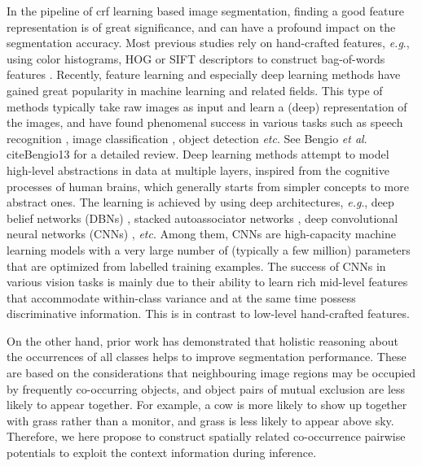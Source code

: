 \documentclass[10pt,3p]{elsarticle}
\def\onedot{.\xspace}
\def\eg{\emph{e.g}\onedot}
\def\etc{\emph{etc}\onedot}
\def\etal{\emph{et al}\onedot}
\newcommand{\crf}{{\sc crf}\xspace}
\begin{document}
In the pipeline of \crf learning based image segmentation, finding a good feature representation is of great significance, and can have a profound impact on the segmentation accuracy. Most previous studies rely on hand-crafted features, \eg, using color histograms, HOG or SIFT descriptors to construct bag-of-words features \cite{Fulkerson08,Fulkerson09,Lucchi12,Yao12,Lucchi13}.
Recently, feature learning and especially deep learning methods have gained great popularity
in machine learning and related fields.
This type of methods typically take raw images as input and learn a (deep) representation
of the images, and have found phenomenal success in various tasks such as speech recognition \cite{Hinton06}, image classification
\cite{deepCNN12,decaf13}, object detection \cite{Ross14} \etc See Bengio \etal \\cite{Bengio13} for a detailed
review.
Deep learning methods attempt to model high-level abstractions in data at multiple layers,
inspired from the cognitive processes of human brains, which generally starts from simpler
concepts to more abstract ones.
The learning is achieved by using deep architectures, \eg, deep belief networks (DBNs) \cite{Hinton06}, stacked autoassociator networks \cite{Bengio07},
deep convolutional
neural networks (CNNs)
\cite{Lecun98,deepCNN12,CVPR15b}, \etc
%
%
%
%
Among them, CNNs are high-capacity machine learning models with a very large number of (typically a
few million)
parameters that are optimized from labelled training examples.
The success of CNNs in various vision tasks \cite{Lecun98,deepCNN12} is mainly
due to their ability to learn rich mid-level features that accommodate within-class
variance and at the same time possess discriminative information.
This is in  contrast to low-level hand-crafted features.


On the other hand, prior work \cite{Rabinovich07,Ladicky13,Roy14} has demonstrated that holistic reasoning about the occurrences of all classes helps to improve segmentation performance.
These are based on the considerations that neighbouring image regions may be occupied by frequently co-occurring objects, and object pairs of mutual exclusion are less likely to appear together.
For example, a cow is more likely to show up together with grass rather than a monitor, and grass is less likely to appear above sky.
Therefore, we here propose to construct spatially related co-occurrence pairwise potentials to exploit the context information during inference.
\end{document}
